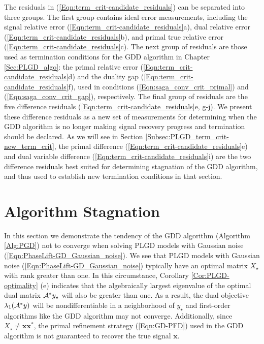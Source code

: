 The residuals in (\ref{Eqn:term_crit-candidate_residuals}) can be separated into three groups.   
The first group contains ideal error measurements, including the signal relative error (\ref{Eqn:term_crit-candidate_residuals}a), dual relative error (\ref{Eqn:term_crit-candidate_residuals}b), and primal true relative error (\ref{Eqn:term_crit-candidate_residuals}c).
The next group of residuals are those used as termination conditions for the GDD algorithm in Chapter \ref{Sec:PLGD_algo}: the primal relative error (\ref{Eqn:term_crit-candidate_residuals}d) and the duality gap (\ref{Eqn:term_crit-candidate_residuals}f), used in conditions (\ref{Eqn:saga_conv_crit_primal}) and (\ref{Eqn:saga_conv_crit_gap}), respectively.
The final group of residuals are the five difference residuals (\ref{Eqn:term_crit-candidate_residuals}e, g-j).
We present these difference residuals as a new set of measurements for determining when the GDD algorithm is no longer making signal recovery progress and termination should be declared.
As we will see in Section \ref{Subsec:PLGD_term_crit-new_term_crit}, the primal difference (\ref{Eqn:term_crit-candidate_residuals}e) and dual variable difference (\ref{Eqn:term_crit-candidate_residuals}i) are the two difference residuals best suited for determining stagnation of the GDD algorithm, and thus used to establish new termination conditions in that section.









\section{Algorithm Stagnation} 		\label{Subsec:PLGD_term_crit-stagnation}





In this section we demonstrate the tendency of the GDD algorithm (Algorithm \ref{Alg:PGD}) not to converge when solving PLGD models with Gaussian noise (\ref{Eqn:PhaseLift-GD_Gaussian_noise}).  
We see that PLGD models with Gaussian noise (\ref{Eqn:PhaseLift-GD_Gaussian_noise}) typically have an optimal matrix $X_\star$ with rank greater than one.  
In this circumstance, Corollary \ref{Cor:PLGD-optimality} (e) indicates that the algebraically largest eigenvalue of the optimal dual matrix ${\mathcal A}^*y_\star$ will also be greater than one.
As a result, the dual objective $\lambda_1({\mathcal A}^*y)$ will be nondifferentiable in a neighborhood of $y_\star$ and first-order algorithms like the GDD algorithm may not converge.
Additionally, since $X_\star \neq \mathbf{x}\mathbf{x}^*$, the primal refinement strategy (\ref{Eqn:GD-PFD}) used in the GDD algorithm is not guaranteed to recover the true signal $\mathbf{x}$.


